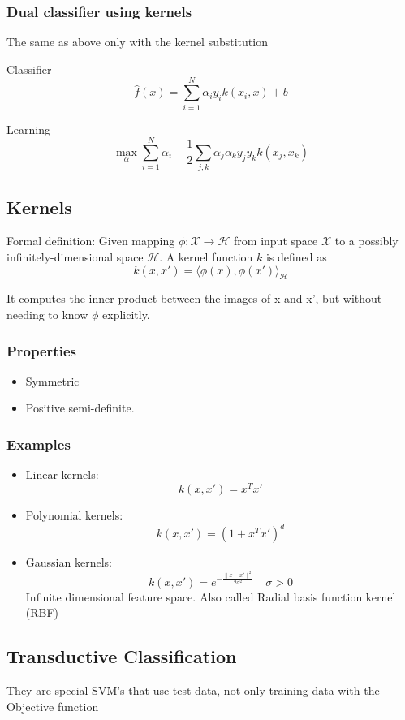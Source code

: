 \documentclass{article}
\begin{document}
\subsubsection{Dual classifier using kernels}
The same as above only with the kernel substitution

Classifier
\[\hat{f}(x) = \sum_{i=1}^N \alpha_i y_i k(x_i, x) + b \]


Learning
\[\max_\alpha\sum_{i=1}^N\alpha_i - \frac{1}{2}\sum_{j,k}\alpha_j\alpha_ky_jy_kk(x_j,x_k)\]

\subsection{Kernels}
Formal definition: Given mapping $\phi: \mathcal{X} \to \mathcal{H}$ from input space $\mathcal{X}$ to a possibly infinitely-dimensional space $\mathcal{H}$. A kernel function $k$ is defined as 
\[k(x,x') = \langle \phi(x), \phi(x')\rangle_{\mathcal{H}}\]

It computes the inner product between the images of x and x', but without needing to know $\phi$ explicitly.

\subsubsection{Properties}
\begin{itemize}
  \item Symmetric
  \item Positive semi-definite.
\end{itemize}

\subsubsection{Examples}
\begin{itemize}
  \item Linear kernels:
  \[k(x,x') = x^Tx'\]
  \item Polynomial kernels:
  \[k(x,x') = (1+x^Tx')^d\]
  \item Gaussian kernels:
  \[k(x,x') = e^{-\frac{\|x-x'\|^2}{2\sigma^2}} \quad \sigma > 0\]
  Infinite dimensional feature space. Also called Radial basis function kernel (RBF)
\end{itemize}

\subsection{Transductive Classification}
They are special SVM's that use test data, not only training data with the Objective function
\end{document}
